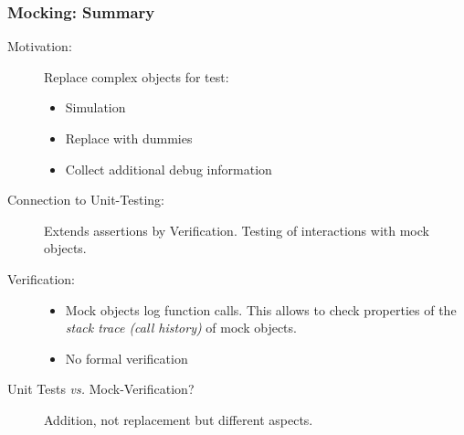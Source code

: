 \begin{frame}
 \frametitle{Mocking: Summary}
 
\begin{description}
\item [Motivation:] \alert{Replace} complex objects for test:
\begin{itemize}
  \item Simulation
  \item Replace with dummies
  \item Collect additional debug information
\end{itemize}
\item [Connection to Unit-Testing:] \alert{Extends assertions} by Verification. Testing of interactions with mock objects.
\item [Verification:]
\begin{itemize}
  \item [] Mock objects log function calls. This allows to check properties of the \textit{stack trace (call history)} of mock objects.
  \item [] \alert{No formal verification}
\end{itemize}
\item [Unit Tests \textit{vs.} Mock-Verification?] \alert{Addition, not replacement} but different aspects.
\end{description}
\end{frame}